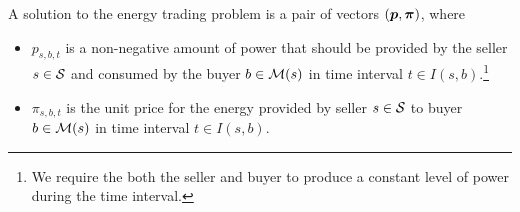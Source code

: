 A solution to the energy trading problem is a pair of vectors $(\boldsymbol{p}, \boldsymbol{\pi})$, where
\begin{itemize}
\item $p_{s,b,t}$ is a non-negative amount of power that should be provided by the seller $s \in \mathcal{S}$ and consumed by the buyer $b \in \mathcal{M}(s)$ in time interval $t \in I(s, b)$.\footnote{We require the both the seller and buyer to produce a constant level of power during the time interval.}
\item $\pi_{s,b,t}$ is the unit price for the energy provided by seller $s \in \mathcal{S}$ to buyer $b \in \mathcal{M}(s)$ in time interval $t \in I(s, b)$.
\end{itemize}

